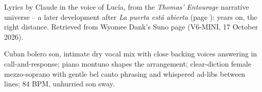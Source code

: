 
\label{sec:la-distancia-justa}
\begin{notes}
Lyrics by Claude in the voice of Lucía, from the \emph{Thomas' Entourage} narrative universe -- a later development after \emph{La puerta está abierta} (page \pageref{sec:la-puerta-esta-abierta}): years on, the right distance. Retrieved from Wyomee Dank's Suno page (V6-MINI, 17 October 2026).
\end{notes}
\begin{style}
Cuban bolero son, intimate dry vocal mix with close backing voices answering in call-and-response; piano montuno shapes the arrangement; clear-diction female mezzo-soprano with gentle bel canto phrasing and whispered ad-libs between lines; 84 BPM, unhurried son sway.
\end{style}
